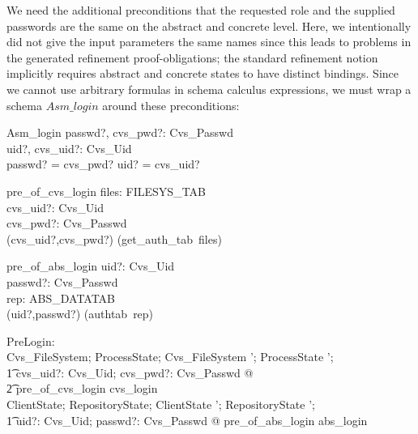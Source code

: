 We need the additional preconditions that the requested role and the supplied
passwords are the same on the abstract and concrete level. Here, we
intentionally did not give the input parameters the same names since this leads
to problems in the generated refinement proof-obligations; the standard
refinement notion implicitly requires abstract and concrete states to have
distinct bindings. Since we cannot use arbitrary formulas in schema calculus
expressions, we must wrap a schema $Asm\_login$ around these preconditions:
\begin{schema}{Asm\_login}
  passwd?, cvs\_pwd?: Cvs\_Passwd \\   
  uid?, cvs\_uid?: Cvs\_Uid \\
  \where
  passwd? = cvs\_pwd? \land uid? = cvs\_uid? \\
\end{schema}


\begin{schema}{pre\_of\_cvs\_login}
  files: FILESYS\_TAB \\
  cvs\_uid?: Cvs\_Uid \\
  cvs\_pwd?: Cvs\_Passwd \\
  \where
  (cvs\_uid?,cvs\_pwd?) \in \dom(get\_auth\_tab~files) \\
\end{schema}
\begin{schema}{pre\_of\_abs\_login}
  uid?: Cvs\_Uid \\
  passwd?: Cvs\_Passwd \\
  rep: ABS\_DATATAB \\
  \where
  (uid?,passwd?) \in \dom(authtab~rep) \\
\end{schema}

\begin{axdef}
  PreLogin: \nat \\
  \where
  \forall Cvs\_FileSystem; ProcessState; Cvs\_FileSystem '; ProcessState '; \\
  \t1 cvs\_uid?: Cvs\_Uid; cvs\_pwd?: Cvs\_Passwd @ \\
  \t2 pre\_of\_cvs\_login \implies \pre cvs\_login \\

  \forall ClientState; RepositoryState; ClientState '; RepositoryState '; \\
  \t1 uid?: Cvs\_Uid; passwd?: Cvs\_Passwd @
  pre\_of\_abs\_login \implies \pre abs\_login \\
\end{axdef}


